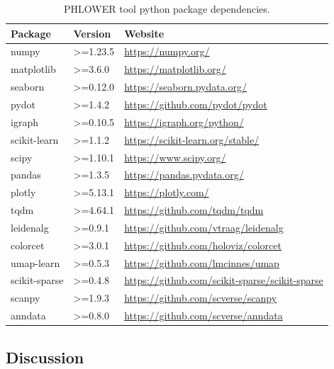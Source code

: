 \begin{table}[!ht]
	\centering
	\begin{tabular}{lll}
		\toprule
		\textbf{Package} & \textbf{Version} & \textbf{Website} \\
		\midrule
			numpy& >=1.23.5 & \url{https://numpy.org/} \\
			matplotlib& >=3.6.0 & \url{https://matplotlib.org/} \\
			seaborn& >=0.12.0 & \url{https://seaborn.pydata.org/} \\
			pydot& >=1.4.2 & \url{https://github.com/pydot/pydot} \\
			igraph& >=0.10.5 & \url{https://igraph.org/python/} \\
			scikit-learn& >=1.1.2 & \url{https://scikit-learn.org/stable/} \\
			scipy& >=1.10.1 & \url{https://www.scipy.org/} \\
			pandas& >=1.3.5 & \url{https://pandas.pydata.org/} \\
			plotly& >=5.13.1 & \url{https://plotly.com/} \\
			tqdm& >=4.64.1 & \url{https://github.com/tqdm/tqdm} \\
			leidenalg& >=0.9.1 & \url{https://github.com/vtraag/leidenalg} \\
			colorcet& >=3.0.1 & \url{https://github.com/holoviz/colorcet} \\
			umap-learn& >=0.5.3 & \url{https://github.com/lmcinnes/umap} \\
			scikit-sparse& >=0.4.8 & \url{https://github.com/scikit-sparse/scikit-sparse} \\
			scanpy& >=1.9.3 & \url{https://github.com/scverse/scanpy} \\
			anndata& >=0.8.0 & \url{https://github.com/scverse/anndata} \\
		\bottomrule
	\end{tabular}
	\vspace{0.1cm}
	\caption[PHLOWER tool python package dependencies]{PHLOWER tool python package dependencies.}
	\label{tab:phlower_python_dependencies}
\end{table}
\subsection{Discussion}
